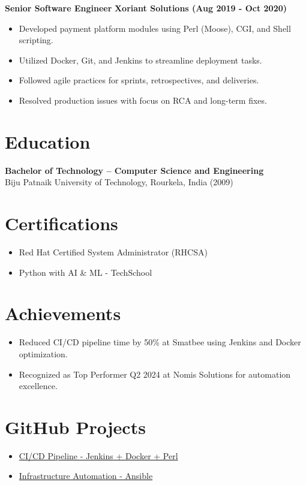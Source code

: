 \documentclass[11pt,a4paper]{article}
\begin{document}
\vspace{1em}
\textbf{Senior Software Engineer} \hfill \textbf{Xoriant Solutions (Aug 2019 - Oct 2020)} \\
\begin{itemize}[leftmargin=*]
  \item Developed payment platform modules using Perl (Moose), CGI, and Shell scripting.
  \item Utilized Docker, Git, and Jenkins to streamline deployment tasks.
  \item Followed agile practices for sprints, retrospectives, and deliveries.
  \item Resolved production issues with focus on RCA and long-term fixes.
\end{itemize}

\section*{Education}
\textbf{Bachelor of Technology – Computer Science and Engineering} \\
Biju Patnaik University of Technology, Rourkela, India (2009)

\section*{Certifications}
\begin{itemize}[leftmargin=*]
  \item Red Hat Certified System Administrator (RHCSA)
  \item Python with AI \& ML - TechSchool
\end{itemize}

\section*{Achievements}
\begin{itemize}[leftmargin=*]
  \item Reduced CI/CD pipeline time by 50\% at Smatbee using Jenkins and Docker optimization.
  \item Recognized as Top Performer Q2 2024 at Nomis Solutions for automation excellence.
\end{itemize}

\section*{GitHub Projects}
\begin{itemize}[leftmargin=*]
  \item \href{https://github.com/satyakaibm/jenkins-resources.git}{CI/CD Pipeline - Jenkins + Docker + Perl}
  \item \href{https://github.com/satyakaibm/Ansible_practice.git}{Infrastructure Automation - Ansible}
\end{itemize}
\end{document}
